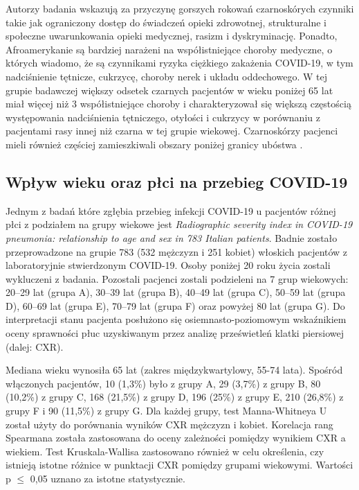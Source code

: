 \documentclass[polish, twoside, 12pt, a4paper]{article}
\theoremstyle{definition}
\theoremstyle{plain}
\theoremstyle{remark}
\begin{document}
Autorzy badania wskazują za przyczynę gorszych rokowań czarnoskórych czynniki takie jak ograniczony dostęp do świadczeń opieki zdrowotnej, strukturalne i społeczne uwarunkowania opieki medycznej, rasizm i dyskryminację. Ponadto, Afroamerykanie są bardziej narażeni na współistniejące choroby medyczne, o których wiadomo, że są czynnikami ryzyka ciężkiego zakażenia COVID-19, w tym nadciśnienie tętnicze, cukrzycę, choroby nerek i układu oddechowego. W tej grupie badawczej większy odsetek czarnych pacjentów w wieku poniżej 65 lat miał więcej niż 3 współistniejące choroby i charakteryzował się większą częstością występowania nadciśnienia tętniczego, otyłości i cukrzycy w porównaniu z pacjentami rasy innej niż czarna w tej grupie wiekowej. Czarnoskórzy pacjenci mieli również częściej zamieszkiwali obszary poniżej granicy ubóstwa \citep{borghesi2020}.

\subsection{Wpływ wieku oraz płci na przebieg COVID-19}

Jednym z badań które zgłębia przebieg infekcji COVID-19 u pacjentów różnej płci z podziałem na grupy wiekowe jest \emph{Radiographic severity index in COVID-19 pneumonia: relationship to age and sex in 783 Italian patients}. Badnie zostało przeprowadzone na grupie 783 (532 mężczyzn i 251 kobiet) włoskich pacjentów z laboratoryjnie stwierdzonym COVID-19. Osoby poniżej 20 roku życia zostali wykluczeni z badania. Pozostali pacjenci zostali podzieleni na 7 grup wiekowych: 20--29 lat (grupa A), 30--39 lat (grupa B), 40--49 lat (grupa C), 50--59 lat (grupa D), 60--69 lat (grupa E), 70--79 lat (grupa F) oraz powyżej 80 lat (grupa G). Do interpretacji stanu pacjenta posłużono się osiemnasto-poziomowym wskaźnikiem oceny sprawności płuc uzyskiwanym przez analizę prześwietleń klatki piersiowej (dalej: CXR).

Mediana wieku wynosiła 65 lat (zakres międzykwartylowy, 55-74 lata). Spośród włączonych pacjentów, 10 (1,3\%) było z grupy A, 29 (3,7\%) z grupy B, 80 (10,2\%) z grupy C, 168 (21,5\%) z grupy D, 196 (25\%) z grupy E, 210 (26,8\%) z grupy F i 90 (11,5\%) z grupy G. Dla każdej grupy, test Manna-Whitneya U został użyty do porównania wyników CXR mężczyzn i kobiet. Korelacja rang Spearmana została zastosowana do oceny zależności pomiędzy wynikiem CXR a wiekiem. Test Kruskala-Wallisa zastosowano również w celu określenia, czy istnieją istotne różnice w punktacji CXR pomiędzy grupami wiekowymi. Wartości p $\leq$ 0,05 uznano za istotne statystycznie.
\end{document}
